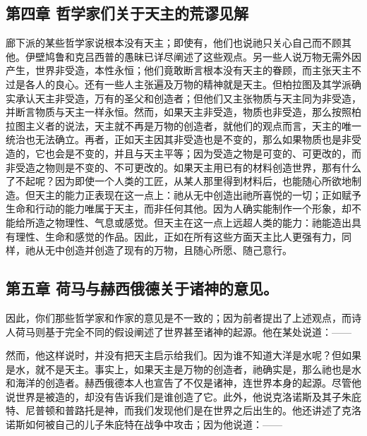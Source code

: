 
\subsection{第四章 哲学家们关于天主的荒谬见解}

廊下派的某些哲学家说根本没有天主；即使有，他们也说祂只关心自己而不顾其他。伊壁鸠鲁和克吕西普的愚昧已详尽阐述了这些观点。另一些人说万物无需外因产生，世界非受造，本性永恒；他们竟敢断言根本没有天主的眷顾，而主张天主不过是各人的良心。还有一些人主张遍及万物的精神就是天主。但柏拉图及其学派确实承认天主非受造，万有的圣父和创造者；但他们又主张物质与天主同为非受造，并断言物质与天主一样永恒。然而，如果天主非受造，物质也非受造，那么按照柏拉图主义者的说法，天主就不再是万物的创造者，就他们的观点而言，天主的唯一统治也无法确立。再者，正如天主因其非受造也是不变的，那么如果物质也是非受造的，它也会是不变的，并且与天主平等；因为受造之物是可变的、可更改的，而非受造之物则是不变的、不可更改的。如果天主用已有的材料创造世界，那有什么了不起呢？因为即使一个人类的工匠，从某人那里得到材料后，也能随心所欲地制造。但天主的能力正表现在这一点上：祂从无中创造出祂所喜悦的一切；正如赋予生命和行动的能力唯属于天主，而非任何其他。因为人确实能制作一个形象，却不能给所造之物理性、气息或感觉。但天主在这一点上远超人类的能力：祂能造出具有理性、生命和感觉的作品。因此，正如在所有这些方面天主比人更强有力，同样，祂从无中创造并创造了现有的万物，且随心所愿、随己意行。\par


\subsection{第五章 荷马与赫西俄德关于诸神的意见。}

因此，你们那些哲学家和作家的意见是不一致的；因为前者提出了上述观点，而诗人荷马则基于完全不同的假设阐述了世界甚至诸神的起源。他在某处说道：——\par

\par

然而，他这样说时，并没有把天主启示给我们。因为谁不知道大洋是水呢？但如果是水，就不是天主。事实上，如果天主是万物的创造者，祂确实是，那么祂也是水和海洋的创造者。赫西俄德本人也宣告了不仅是诸神，连世界本身的起源。尽管他说世界是被造的，却没有告诉我们是谁创造了它。此外，他说克洛诺斯及其子朱庇特、尼普顿和普路托是神，而我们发现他们是在世界之后出生的。他还讲述了克洛诺斯如何被自己的儿子朱庇特在战争中攻击；因为他说道：——\par


